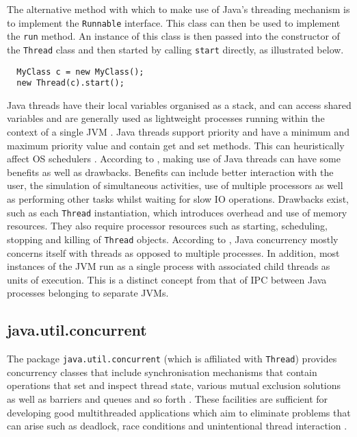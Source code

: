 \documentclass[12pt,a4paper,oneside]{article}
\def\code#1{\texttt{#1}}
\begin{document}
  The alternative method with which to make use of Java's threading mechanism is to implement the \code{Runnable} interface. This class can then be used to implement the \code{run} method. An instance of this class is then passed into the constructor of the \code{Thread} class and then started by calling \code{start} directly, as illustrated below.

  \begin{verbatim}
  MyClass c = new MyClass();
  new Thread(c).start();
  \end{verbatim}

  Java threads  have their local variables organised as a stack, and can access shared variables and are generally used as lightweight processes running within the context of a single JVM \citep{trainBook}. Java threads support priority and have a minimum and maximum priority value and contain get and set methods. This can heuristically affect OS schedulers \citep{LeaConcurrentProgInJavaDesignPrinciplesPatterns}. According to \cite{HydeJavaThreadProg}, making use of Java threads can have some benefits as well as drawbacks. Benefits can include better interaction with the user, the simulation of simultaneous activities, use of multiple processors as well as performing other tasks whilst waiting for slow IO operations. Drawbacks exist, such as each \code{Thread} instantiation, which introduces overhead and use of memory resources. They also require processor resources such as starting, scheduling, stopping and killing of \code{Thread} objects. According to \cite{JavaAPI}, Java concurrency mostly concerns itself with threads as opposed to multiple processes. In addition, most instances of the JVM run as a single process with associated child threads as units of execution. This is a distinct concept from that of IPC between Java processes belonging to separate JVMs.

  \subsection{java.util.concurrent}
    The package \code{java.util.concurrent} (which is affiliated with \code{Thread}) provides concurrency classes that include synchronisation mechanisms that contain operations that set and inspect thread state, various mutual exclusion solutions as well as barriers and queues and so forth \citep{Lea_java.util.concurrent}. These facilities are sufficient for developing good multithreaded applications which aim to eliminate problems that can arise such as deadlock, race conditions and unintentional thread interaction \citep{WellsEfficientIPCJava}.
\end{document}
